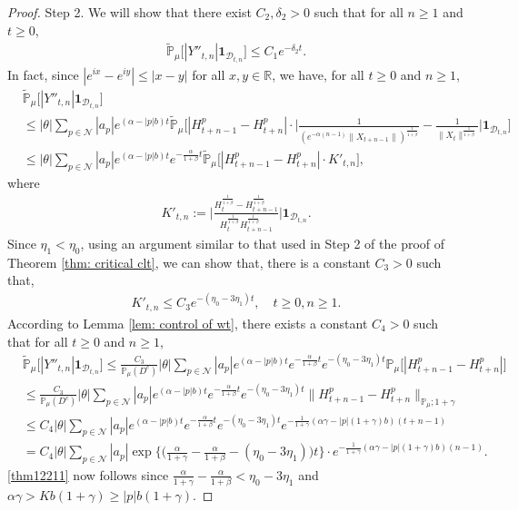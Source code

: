 \documentclass[12pt,a4paper]{amsart}
\theoremstyle{plain}
\theoremstyle{definition}
\numberwithin{equation}{section}
\begin{document}
\begin{proof}
    Step 2.
    We will show that there exist $C_2,\delta_2 > 0$ such that for all $n\geq 1$ and $t\geq 0$,
\begin{align}
\label{thm12211}
    \mathbb{\widetilde{P}}_{\mu}\big[|Y''_{t,n}|\mathbf{1}_{\mathcal{D}_{t,n}}\big]\leq C_1e^{-\delta_2 t}.
\end{align}
    In fact, since $|e^{ix}-e^{iy}|\leq|x-y|$ for all $x,y\in \mathbb R$, we have, for all $t \geq 0$ and $n\geq 1$,
\begin{align}\label{large: used next}
    &\widetilde{\mathbb{P}}_{\mu}\big[|Y''_{t,n}|\mathbf{1}_{\mathcal{D}_{t,n}}\big]\\
    &\leq |\theta|\sum_{p\in\mathcal{N}}|a_p|e^{(\alpha-|p|b)t}\widetilde{\mathbb{P}}_{\mu}\Big[|H_{t+n-1}^p-H_{t+n}^p|\cdot\Big|\frac{1}{(e^{-\alpha(n-1)}\|X_{t+n-1}\|)^{\frac{1}{1+\beta}}}-\frac{1}{\|X_t\|^{\frac{1}{1+\beta}}}\Big|\mathbf{1}_{\mathcal{D}_{t,n}}\Big]\\
    &\leq |\theta|\sum_{p\in\mathcal{N}}|a_p|e^{(\alpha-|p|b)t}e^{-\frac{\alpha}{1+\beta}t}\widetilde{\mathbb{P}}_{\mu}\Big[|H_{t+n-1}^p-H_{t+n}^p|\cdot K'_{t,n}\Big],
\end{align}
    where
\begin{align}
    K'_{t,n}
    :=\Big|\frac{H_t^{\frac{1}{1+\beta}}-H_{t+n-1}^{\frac{1}{1+\beta}}}{H_t^{\frac{1}{1+\beta}}H_{t+n-1}^{\frac{1}{1+\beta}}}\Big|\mathbf{1}_{\mathcal{D}_{t,n}}.
\end{align}
	Since $\eta_1 < \eta_0$, using an argument similar to that used in Step 2 of the proof of Theorem \ref{thm: critical clt}, we can show that, there is a constant $C_3> 0$ such that,
\begin{align}
\label{ineq: control of Kkt1}
     K'_{t,n}
     \leq C_3 e^{-(\eta_0 - 3\eta_1) t},
     \quad t \geq 0, n\geq 1.
\end{align}
    According to Lemma \ref{lem: control of wt}, there exists a constant $C_4>0$ such that for all $t\geq 0$ and $n\geq 1$,
\begin{align}\label{ineq:used next 2}
    &\widetilde{\mathbb{P}}_{\mu}\big[|Y''_{t,n}|\mathbf{1}_{\mathcal{D}_{t,n}}\big]
    \leq \frac{C_3}{\mathbb{P}_{\mu}(D^c)} |\theta|\sum_{p\in\mathcal{N}}|a_p|e^{(\alpha-|p|b)t}e^{-\frac{\alpha}{1+\beta}t}e^{-(\eta_0-3\eta_1)t}\mathbb{P}_{\mu}\Big[|H_{t+n-1}^p-H_{t+n}^p|\Big]\\
    &\leq \frac{C_3}{\mathbb{P}_{\mu}(D^c)} |\theta|\sum_{p\in\mathcal{N}}|a_p|e^{(\alpha-|p|b)t}e^{-\frac{\alpha}{1+\beta}t}e^{-(\eta_0-3\eta_1)t}\|H_{t+n-1}^p-H_{t+n}^p\|_{\mathbb{P}_{\mu};1+\gamma}
    \\&\leq C_4|\theta|\sum_{p\in\mathcal{N}}|a_p|e^{(\alpha-|p|b)t}e^{-\frac{\alpha}{1+\beta}t}e^{-(\eta_0-3\eta_1)t}e^{-\frac{1}{1+\gamma}(\alpha\gamma-|p|(1+\gamma)b)(t+n-1)}\\
    &=C_4|\theta|\sum_{p\in\mathcal{N}}|a_p|\exp\Big\{\Big(\frac{\alpha}{1+\gamma}-\frac{\alpha}{1+\beta}-(\eta_0-3\eta_1)\Big)t\Big\}\cdot e^{-\frac{1}{1+\gamma}(\alpha\gamma-|p|(1+\gamma)b)(n-1)}.
\end{align}
    \eqref{thm12211} now follows  since $\frac{\alpha}{1+\gamma}-\frac{\alpha}{1+\beta}<\eta_0-3\eta_1$ and $\alpha\gamma>Kb(1+\gamma)\geq |p|b(1+\gamma)$.


\end{proof}
\end{document}
